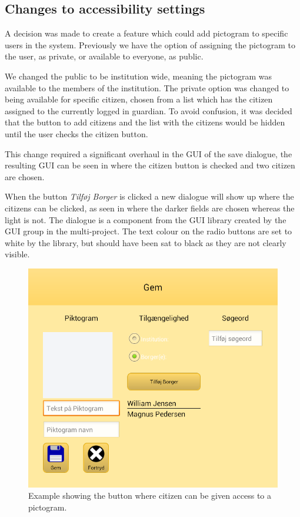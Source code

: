 \subsection{Changes to accessibility settings}
A decision was made to create a feature which could add pictogram to specific users in the system. 
Previously we have the option of assigning the pictogram to the user, as private, or available to everyone, as public.

We changed the public to be institution wide, meaning the pictogram was available to the members of the institution.
The private option was changed to being available for specific citizen, chosen from a list which has the citizen assigned to the currently logged in guardian.
To avoid confusion, it was decided that the button to add citizens and the list with the citizens would be hidden until the user checks the citizen button.

This change required a significant overhaul in the GUI of the save dialogue, the resulting GUI can be seen in  where the citizen button is checked and two citizen are chosen.

When the button \textit{Tilføj Borger} is clicked a new dialogue will show up where the citizens can be clicked, as seen in  where the darker fields are chosen whereas the light is not.
The dialogue is a component from the GUI library created by the GUI group in the multi-project.
The text colour on the radio buttons are set to white by the library, but should have been sat to black as they are not clearly visible.



\begin{figure}
\includegraphics[scale=0.5]{media/sprint4/save_dialog2}
\caption{Example showing the button where citizen can be given access to a pictogram.}
\label{fig:save2}
\end{figure}

